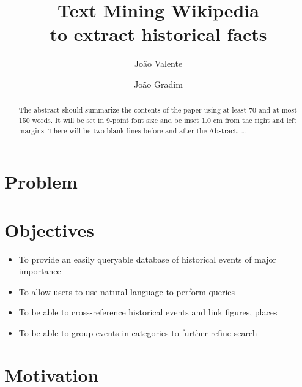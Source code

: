 \documentclass{llncs}
\begin{document}
\mainmatter              %
%
\title{Text Mining Wikipedia\\to extract historical facts}
%
%
\author{João Valente \and João Gradim}
%
%
%

\maketitle              %

\begin{abstract}
The abstract should summarize the contents of the paper
using at least 70 and at most 150 words. It will be set in 9-point
font size and be inset 1.0 cm from the right and left margins.
There will be two blank lines before and after the Abstract. \dots
\end{abstract}

\section{Problem}

\section{Objectives}

\begin{itemize}
	\item To provide an easily queryable database of historical events of major importance
	\item To allow users to use natural language to perform queries
	\item To be able to cross-reference historical events and link figures, places
	\item To be able to group events in categories to further refine search
\end{itemize}

\section{Motivation}
\end{document}
